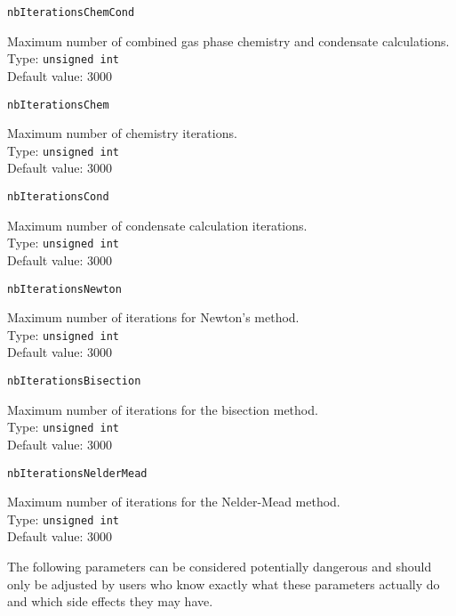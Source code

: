 \documentclass[numbers=noenddot]{aux/fcmanual}
\begin{document}
\lstinline!nbIterationsChemCond!
\begin{addmargin}[25pt]{0pt}
	Maximum number of combined gas phase chemistry and condensate calculations. \\
	Type: \lstinline!unsigned int!\\
	Default value: 3000
\end{addmargin}


\lstinline!nbIterationsChem!
\begin{addmargin}[25pt]{0pt}
	Maximum number of chemistry iterations. \\
	Type: \lstinline!unsigned int!\\
	Default value: 3000
\end{addmargin}


\lstinline!nbIterationsCond!
\begin{addmargin}[25pt]{0pt}
	Maximum number of condensate calculation iterations. \\
	Type: \lstinline!unsigned int!\\
	Default value: 3000
\end{addmargin}


\lstinline!nbIterationsNewton!
\begin{addmargin}[25pt]{0pt}
	Maximum number of iterations for Newton's method. \\
	Type: \lstinline!unsigned int!\\
	Default value: 3000
\end{addmargin}

\lstinline!nbIterationsBisection!
\begin{addmargin}[25pt]{0pt}
	Maximum number of iterations for the bisection method. \\
	Type: \lstinline!unsigned int!\\
	Default value: 3000
\end{addmargin}


\lstinline!nbIterationsNelderMead!
\begin{addmargin}[25pt]{0pt}
	Maximum number of iterations for the Nelder-Mead method. \\
	Type: \lstinline!unsigned int!\\
	Default value: 3000
\end{addmargin}

\bigbreak

The following parameters can be considered potentially dangerous and should only be adjusted by users who know exactly what these parameters actually do and which side effects they may have. \\
\end{document}
